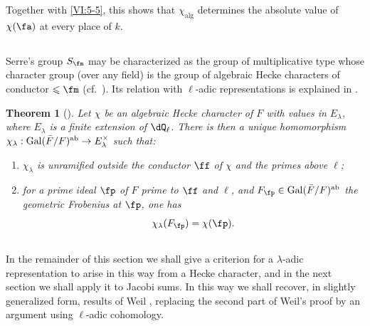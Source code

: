 \documentclass[12pt,oneside,english]{smfbook}
\DeclareMathOperator{\gal}{Gal}
\newcounter{char}
\newtheorem{theorem_}[subsection]{Theorem}
\begin{document}
Together with \ref{VI:5-5}, this shows that $\chi_{\mathrm{alg}}$ determines the absolute value of $\chi(\fa)$ at every place of $k$.

\subsection{}\label{VI:5-7}

Serre's group $S_\fm$ may be characterized as the group of multiplicative type whose character group (over any field) is the group of algebraic Hecke characters of conductor $\leqslant\fm$ (cf.\ \cite[II.2.1 and II.2.2]{se68}). Its relation with $\ell$-adic representations is explained in \cite[II.2.3]{se68}.

\begin{theorem_}[{\cite{se68}}]\label{VI:5-8}
Let $\chi$ be an algebraic Hecke character of $F$ with values in $E_\lambda$, where $E_\lambda$ is a finite extension of $\dQ_\ell$. There is then a unique homomorphism $\chi_\lambda:\gal(\bar F/F)^\textnormal{ab}\to E_\lambda^\times$ such that:
\begin{enumerate}[\indent (i)]
  \item $\chi_\lambda$ is unramified outside the conductor $\ff$ of $\chi$ and the primes above $\ell$;
  \item for a prime ideal $\fp$ of $F$ prime to $\ff$ and $\ell$, and $F_\fp\in\gal(\bar F/F)^\textnormal{ab}$ the geometric Frobenius at $\fp$, one has
    \[
      \chi_\lambda(F_\fp) = \chi(\fp) \text{.}
    \]
\end{enumerate}
\end{theorem_}

\subsection{}\label{VI:5-9}

In the remainder of this section we shall give a criterion for a $\lambda$-adic representation to arise in this way from a Hecke character, and in the next section we shall apply it to Jacobi sums. In this way we shall recover, in slightly generalized form, results of Weil \cite{we52,we74-2}, replacing the second part of Weil's proof by an argument using $\ell$-adic cohomology.
\end{document}
